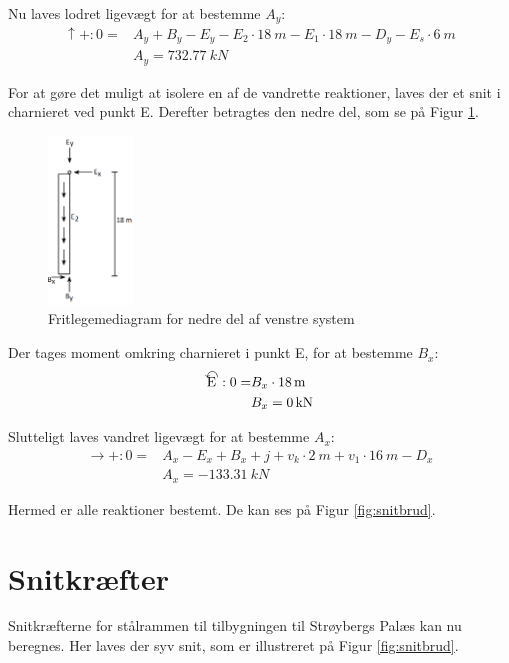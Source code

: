 Nu laves lodret ligevægt for at bestemme $A_y$:
\begin{equation}
\begin{split}
	\uparrow+: 0 = & A_y + B_y - E_y - E_2 \cdot \SI{18}{m} - E_1 \cdot \SI{18}{m} - D_y - E_s \cdot \SI{6}{m}
	\\ &
	A_y = \SI{732,77}{kN}
\end{split}
\end{equation}

For at gøre det muligt at isolere en af de vandrette reaktioner, laves der et snit i charnieret ved punkt E. Derefter betragtes den nedre del, som se på Figur \ref{fig:slutte}. 

\begin{figure}[H]
	\centering
	\includegraphics[width=0.2\textwidth]{billeder/fldreakbrud.png}
	\caption{Fritlegemediagram for nedre del af venstre system}
	\label{fig:slutte}
\end{figure}

Der tages moment omkring charnieret i punkt E, for at bestemme $B_x$:
\begin{equation}
\begin{split}
	\ALN{\text{E}}: 0 = & B_x \cdot \SI{18}{m}
	\\ &
	B_x = \SI{0}{kN}
\end{split}
\end{equation}

Slutteligt laves vandret ligevægt for at bestemme $A_x$:
\begin{equation}
\begin{split}
	\rightarrow+: 0 = & A_x - E_x + B_x + j + v_k \cdot \SI{2}{m} + v_1 \cdot \SI{16}{m} - D_x
	\\ &
	A_x = \SI{-133,31}{kN}
\end{split}
\end{equation} 

Hermed er alle reaktioner bestemt. De kan ses på Figur \ref{fig:snitbrud}.

\section{Snitkræfter}
Snitkræfterne for stålrammen til tilbygningen til Strøybergs Palæs kan nu beregnes. Her laves der syv snit, som er illustreret på Figur \ref{fig:snitbrud}.


